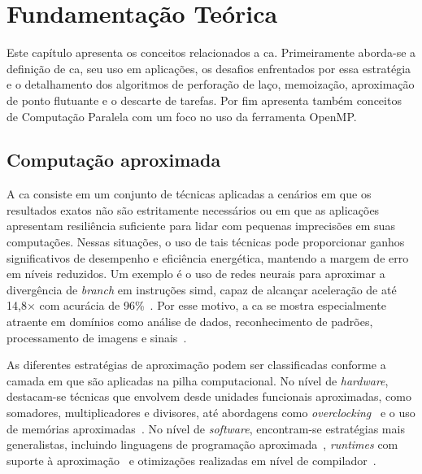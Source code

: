 \chapter{Fundamentaç\~ao Te\'orica}\label{cap:fundamentacaoTeorica}

Este capítulo apresenta os conceitos relacionados a \gls{ca}. Primeiramente aborda-se a definição de \gls{ca}, seu uso em aplicações, os desafios enfrentados por essa estratégia e o detalhamento dos algoritmos de perforação de laço, memoização, aproximação de ponto flutuante e o descarte de tarefas. Por fim apresenta também conceitos de Computação Paralela com um foco no uso da ferramenta OpenMP.

\section{Computação aproximada}\label{sec:compAprox}

A \gls{ca} consiste em um conjunto de técnicas aplicadas a cenários em que os resultados exatos não são estritamente necessários ou em que as aplicações apresentam resiliência suficiente para lidar com pequenas imprecisões em suas computações. Nessas situações, o uso de tais técnicas pode proporcionar ganhos significativos de desempenho e eficiência energética, mantendo a margem de erro em níveis reduzidos. Um exemplo é o uso de redes neurais para aproximar a divergência de \textit{branch} em instruções \gls{simd}, capaz de alcançar aceleração de até 14,8$\times$ com acurácia de 96\%~\cite{grigorian2015}. Por esse motivo, a \gls{ca} se mostra especialmente atraente em domínios como análise de dados, reconhecimento de padrões, processamento de imagens e sinais~\cite{mittal2016, chippa2013}.

As diferentes estratégias de aproximação podem ser classificadas conforme a camada em que são aplicadas na pilha computacional. No nível de \textit{hardware}, destacam-se técnicas que envolvem desde unidades funcionais aproximadas, como somadores, multiplicadores e divisores, até abordagens como \textit{overclocking}~\cite{leon2025a,leon2025b} e o uso de memórias aproximadas~\cite{fabricio2020}. No nível de \textit{software}, encontram-se estratégias mais generalistas, incluindo linguagens de programação aproximada~\cite{sampson2015}, \textit{runtimes} com suporte à aproximação~\cite{li2018,reis2024} e otimizações realizadas em nível de compilador~\cite{oliveira2024a,oliveira2024b}.


